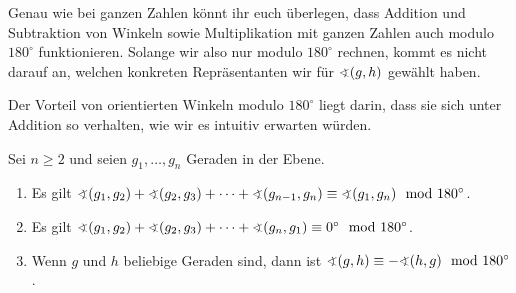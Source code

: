 Genau wie bei ganzen Zahlen könnt ihr euch überlegen, dass Addition und Subtraktion von Winkeln sowie Multiplikation mit ganzen Zahlen auch modulo $180^\circ$ funktionieren. Solange wir also nur modulo $180^\circ$ rechnen, kommt es nicht darauf an, welchen konkreten Repräsentanten wir für $\winkel (g,h)$ gewählt haben.

Der Vorteil von orientierten Winkeln modulo $180^\circ$ liegt darin, dass sie sich unter Addition so verhalten, wie wir es intuitiv erwarten würden.
\begin{satzmitnamen}
	Sei $n\geqslant 2$ und seien $g_1,\dotsc,g_n$ Geraden in der Ebene.
	\begin{enumerate}
		\item Es gilt $\winkel(g_1,g_2) + \winkel(g_2,g_3)+ \dotsb + \winkel(g_{n-1},g_n) \equiv \winkel(g_1,g_n) \mod 180^\circ$.\label{eigenschaft:OrientierteWinkelAdditiv}
		\item Es gilt $\winkel(g_1,g_2) + \winkel(g_2,g_3) + \dotsb + \winkel(g_n,g_1) \equiv 0^\circ  \mod 180^\circ$.\label{eigenschaft:OrientierteWinkelAddierenZuNull}
		\item Wenn $g$ und $h$ beliebige Geraden sind, dann ist $\winkel(g,h) \equiv -\winkel(h,g) \mod 180^\circ$.\label{eigenschaft:OrientierungVorzeichen}
	\end{enumerate}
\end{satzmitnamen}
